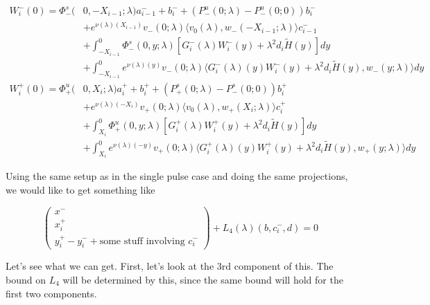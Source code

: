 \documentclass[12pt]{article}
\begin{document}
\begin{enumerate}
\begin{align*}
W_i^-(0) = \Phi^s_-(&0, -X_{i-1}; \lambda)a_{i-1}^- + b_i^- + (P^u_-(0; \lambda) - P^u_-(0; 0))b_i^- \\
&+ e^{\nu(\lambda)(X_{i-1})} v_-(0; \lambda) \langle v_0(\lambda), w_-(-X_{i-1}; \lambda) \rangle c_{i-1}^- \\
&+ \int_{-X_{i-1}}^0 \Phi^s_-(0, y; \lambda) [ G_i^-(\lambda)W_i^-(y) + \lambda^2 d_i \tilde{H}(y) ] dy \\
&+ \int_{-X_{i-1}}^0
e^{\nu(\lambda)(y)} v_-(0; \lambda) \langle G_i^-(\lambda)(y)W_i^-(y) + \lambda^2 d_i \tilde{H}(y), w_-(y; \lambda) \rangle dy \\
W_i^+(0) = \Phi^u_+(&0, X_i; \lambda)a_i^+ + b_i^+ + (P^s_+(0; \lambda) - P^s_-(0; 0))b_i^+ \\
&+ e^{\nu(\lambda)(-X_i)} v_+(0; \lambda) \langle v_0(\lambda), w_+(X_i; \lambda) \rangle c_i^+ \\
&+ \int_{X_i}^0 \Phi^u_+(0, y; \lambda) [ G_i^+(\lambda)W_i^+(y) + \lambda^2 d_i \tilde{H}(y) ] dy \\
&+ \int_{X_i}^0 e^{\nu(\lambda)(-y)} v_+(0; \lambda) \langle G_i^+(\lambda)(y)W_i^+(y) + \lambda^2 d_i \tilde{H}(y), w_+(y; \lambda) \rangle dy
\end{align*}

Using the same setup as in the single pulse case and doing the same projections, we would like to get something like

\[
\begin{pmatrix}x^- \\ x_i^+ \\ y_i^+ - y_i^- + \text{some stuff involving $c_i^-$} \end{pmatrix}+ L_4(\lambda)(b, c_i^-,d) = 0
\]

Let's see what we can get. First, let's look at the 3rd component of this. The bound on $L_4$ will be determined by this, since the same bound will hold for the first two components.


\end{enumerate}
\end{document}
